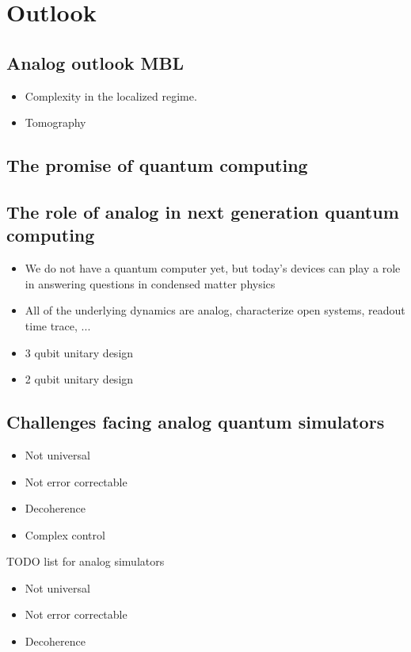 \chapter[Outlook]{Outlook}

\section{Analog outlook MBL}

\begin{itemize}
\item Complexity in the localized regime.
\item Tomography
\end{itemize}


\section{The promise of quantum computing}

\section{The role of analog in next generation quantum computing}
\begin{itemize}
\item We do not have a quantum computer yet, but today's devices can play a role in answering questions in condensed matter physics
\item All of the underlying dynamics are analog, characterize open systems, readout time trace, ...
\item 3 qubit unitary design
\item 2 qubit unitary design
\end{itemize}

\section{Challenges facing analog quantum simulators}

\begin{itemize}
\item Not universal
\item Not error correctable
\item Decoherence
\item Complex control
\end{itemize}

TODO list for analog simulators
\begin{itemize}
    \item Not universal
    \item Not error correctable
    \item Decoherence
\end{itemize}


